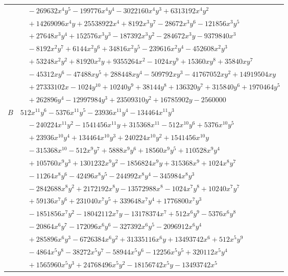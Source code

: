 \documentclass[11pt]{article}
\begin{document}
\begin{longtable}{@{}ll@{}}
 & $\quad -269632x^{4}y^{5}-199776x^{4}y^{4}-3022160x^{4}y^{3}+6313192x^{4}y^{2}$\\
 & $\quad +14269096x^{4}y+25538922x^{4}+8192x^{3}y^{7}-28672x^{3}y^{6}-121856x^{3}y^{5}$\\
 & $\quad +27648x^{3}y^{4}+152576x^{3}y^{3}-187392x^{3}y^{2}-284672x^{3}y-9379840x^{3}$\\
 & $\quad -8192x^{2}y^{7}+6144x^{2}y^{6}+34816x^{2}y^{5}-239616x^{2}y^{4}-452608x^{2}y^{3}$\\
 & $\quad +53248x^{2}y^{2}+81920x^{2}y+9355264x^{2}-1024xy^{9}+15360xy^{8}+35840xy^{7}$\\
 & $\quad -45312xy^{6}-47488xy^{5}+288448xy^{4}-509792xy^{3}-41767052xy^{2}+14919504xy$\\
 & $\quad +27333102x-1024y^{10}+10240y^{9}+38144y^{8}+136320y^{7}+315840y^{6}+1970464y^{5}$\\
 & $\quad +262896y^{4}-12997984y^{3}+23509310y^{2}+16785902y-2560000$\\
$B$ & $512x^{11}y^{6}-5376x^{11}y^{5}-23936x^{11}y^{4}-134464x^{11}y^{3}$\\
 & $\quad -240224x^{11}y^{2}-1541456x^{11}y+315368x^{11}-512x^{10}y^{6}+5376x^{10}y^{5}$\\
 & $\quad +23936x^{10}y^{4}+134464x^{10}y^{3}+240224x^{10}y^{2}+1541456x^{10}y$\\
 & $\quad -315368x^{10}-512x^{9}y^{7}+5888x^{9}y^{6}+18560x^{9}y^{5}+110528x^{9}y^{4}$\\
 & $\quad +105760x^{9}y^{3}+1301232x^{9}y^{2}-1856824x^{9}y+315368x^{9}+1024x^{8}y^{7}$\\
 & $\quad -11264x^{8}y^{6}-42496x^{8}y^{5}-244992x^{8}y^{4}-345984x^{8}y^{3}$\\
 & $\quad -2842688x^{8}y^{2}+2172192x^{8}y-13572988x^{8}-1024x^{7}y^{8}+10240x^{7}y^{7}$\\
 & $\quad +59136x^{7}y^{6}+231040x^{7}y^{5}+339648x^{7}y^{4}+1776800x^{7}y^{3}$\\
 & $\quad -1851856x^{7}y^{2}-18042112x^{7}y-13178374x^{7}+512x^{6}y^{9}-5376x^{6}y^{8}$\\
 & $\quad -20864x^{6}y^{7}-172096x^{6}y^{6}-327392x^{6}y^{5}-2096912x^{6}y^{4}$\\
 & $\quad +285896x^{6}y^{3}-6726384x^{6}y^{2}+31335116x^{6}y+13493742x^{6}+512x^{5}y^{9}$\\
 & $\quad -4864x^{5}y^{8}-38272x^{5}y^{7}-58944x^{5}y^{6}-12256x^{5}y^{5}+320112x^{5}y^{4}$\\
 & $\quad +1565960x^{5}y^{3}+24768496x^{5}y^{2}-18156742x^{5}y-13493742x^{5}$\\

\end{longtable}
\end{document}
